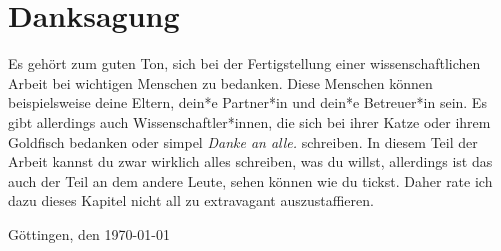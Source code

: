 

\section*{Danksagung}

Es gehört zum guten Ton, sich bei der Fertigstellung einer wissenschaftlichen Arbeit bei wichtigen Menschen zu bedanken. Diese Menschen können beispielsweise deine Eltern, dein*e Partner*in und dein*e Betreuer*in sein. Es gibt allerdings auch Wissenschaftler*innen, die sich bei ihrer Katze oder ihrem Goldfisch bedanken oder simpel \textit{Danke an alle.} schreiben. In diesem Teil der Arbeit kannst du zwar wirklich alles schreiben, was du willst, allerdings ist das auch der Teil an dem andere Leute, sehen können wie du tickst. Daher rate ich dazu dieses Kapitel nicht all zu extravagant auszustaffieren.
\vspace{3em}

Göttingen, den \today
